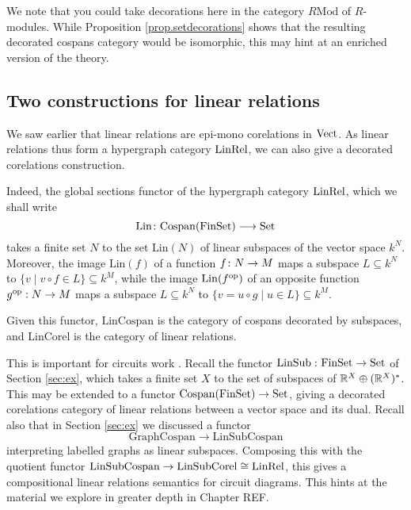We note that you could take decorations here in the category $R\mathrm{Mod}$ of
$R$-modules. While Proposition \ref{prop.setdecorations} shows that the
resulting decorated cospans category would be isomorphic, this may hint at an
enriched version of the theory.

\subsection{Two constructions for linear relations}

We saw earlier that linear relations are epi-mono corelations in $\mathrm{Vect}$. As
linear relations thus form a hypergraph category $\mathrm{LinRel}$, we can also give a
decorated corelations construction. 

Indeed, the global sections functor of the hypergraph category $\mathrm{LinRel}$, which
we shall write
\[
  \mathrm{Lin} {\colon}\mathrm{Cospan}(\mathrm{FinSet}) \longrightarrow \mathrm{Set}
\]
takes a finite set $N$ to the set $\mathrm{Lin}(N)$ of linear subspaces of the
vector space $k^N$. Moreover, the image $\mathrm{Lin}(f)$ of a function $f{\colon}
N \to M$ maps a subspace $L \subseteq k^N$ to $\{v \mid v\circ f \in L\}
\subseteq k^M$, while the image $\mathrm{Lin}(f^{\mathrm{op}})$ of an opposite function
$g^{\mathrm{op}}: N \to M$ maps a subspace $L \subseteq k^N$ to $\{v = u \circ g \mid u
\in L\} \subseteq k^M$. 

Given this functor, $\mathrm{LinCospan}$ is the category of cospans decorated by
subspaces, and $\mathrm{LinCorel}$ is the category of linear relations. 

This is important for circuits work \cite{BF,BSZ}. Recall the functor
$\operatorname{LinSub}{\colon} \mathrm{FinSet} \to \mathrm{Set}$ of Section \ref{sec:ex}, which takes a finite
set $X$ to the set of subspaces of ${\mathbb{R}}^X \oplus ({\mathbb{R}}^X)^*$.  This may be extended
to a functor $\operatorname{{Cospan}}(\mathrm{FinSet}) \to \mathrm{Set}$, giving a decorated corelations
category of linear relations between a vector space and its dual. Recall also
that in Section \ref{sec:ex} we discussed a functor 
\[
  \mathrm{GraphCospan} \to \mathrm{LinSubCospan}
\]
interpreting labelled graphs as linear subspaces. Composing this with the
quotient functor $\mathrm{LinSubCospan} \to \mathrm{LinSubCorel}\cong \mathrm{LinRel}$,
this gives a compositional linear relations semantics for circuit diagrams. This
hints at the material we explore in greater depth in Chapter REF.



%
%
%







